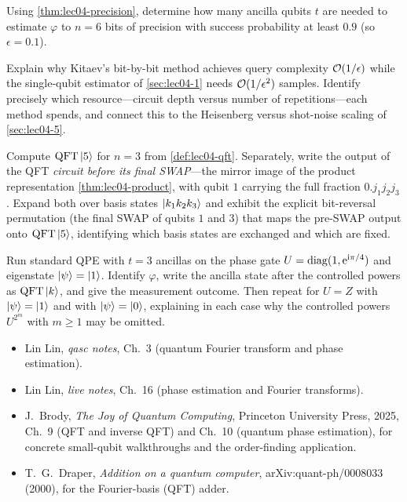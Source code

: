 \begin{exercise}\label{ex:lec04-9}
Using \cref{thm:lec04-precision}, determine how many ancilla qubits $t$ are needed
to estimate $\varphi$ to $n=6$ bits of precision with success probability at
least $0.9$ (so $\epsilon=0.1$).
\end{exercise}

\begin{exercise}\label{ex:lec04-10}
Explain why Kitaev's bit-by-bit method achieves query complexity
$\mathcal{O}(1/\epsilon)$ while the single-qubit estimator of \cref{sec:lec04-1} needs
$\mathcal{O}(1/\epsilon^{2})$ samples. Identify precisely which resource---circuit
depth versus number of repetitions---each method spends, and connect this to the
Heisenberg versus shot-noise scaling of \cref{sec:lec04-5}.
\end{exercise}

\begin{exercise}\label{ex:lec04-11}
Compute $\mathrm{QFT}\ket{5}$ for $n=3$ from \cref{def:lec04-qft}. Separately, write the
output of the QFT \emph{circuit before its final SWAP}---the mirror image of the
product representation \cref{thm:lec04-product}, with qubit $1$ carrying the full
fraction $0.j_1 j_2 j_3$. Expand both over basis states $\ket{k_1 k_2 k_3}$ and
exhibit the explicit bit-reversal permutation (the final SWAP of qubits $1$ and $3$)
that maps the pre-SWAP output onto $\mathrm{QFT}\ket5$, identifying which basis states are
exchanged and which are fixed.
\end{exercise}

\begin{exercise}\label{ex:lec04-12}
Run standard QPE with $t=3$ ancillas on the phase gate $U=\operatorname{diag}(1,\mathrm{e}^{\mathrm{i}\pi/4})$
and eigenstate $\ket{\psi}=\ket{1}$. Identify $\varphi$, write the ancilla state
after the controlled powers as $\mathrm{QFT}\ket{k}$, and give the measurement outcome.
Then repeat for $U=Z$ with $\ket{\psi}=\ket{1}$ and with $\ket{\psi}=\ket{0}$,
explaining in each case why the controlled powers $U^{2^{m}}$ with $m\ge1$ may be
omitted.
\end{exercise}

\readingsection
\begin{itemize}[leftmargin=1.4em]
  \item Lin Lin, \emph{qasc notes}, Ch.~3 (quantum Fourier transform and phase
        estimation).
  \item Lin Lin, \emph{live notes}, Ch.~16 (phase estimation and Fourier
        transforms).
  \item J.~Brody, \emph{The Joy of Quantum Computing}, Princeton University
        Press, 2025, Ch.~9 (QFT and inverse QFT) and Ch.~10 (quantum phase
        estimation), for concrete small-qubit walkthroughs and the order-finding
        application.
  \item T.~G.~Draper, \emph{Addition on a quantum computer},
        arXiv:quant-ph/0008033 (2000), for the Fourier-basis (QFT) adder.
\end{itemize}
